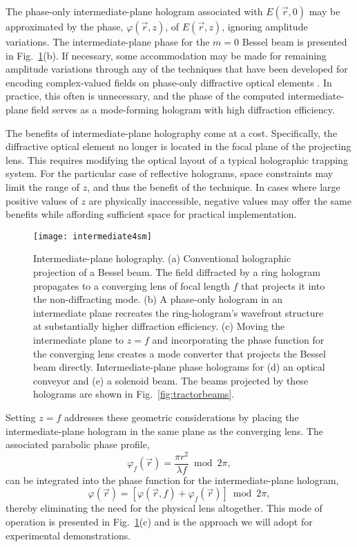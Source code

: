 The phase-only intermediate-plane hologram associated with
$E(\vec{r},0)$ may be approximated by the phase, $\varphi(\vec{r},z)$,
of $E(\vec{r},z)$, ignoring amplitude variations.
The intermediate-plane phase for the $m = 0$ Bessel beam
is presented in Fig.~\ref{fig:intermediate}(b).
If necessary, some accommodation may be made for remaining
amplitude variations through any of the techniques
that have been developed for encoding complex-valued
fields on phase-only diffractive optical elements \cite{roichman06}.
In practice, this often is unnecessary, and the phase of the
computed intermediate-plane field serves as a
mode-forming hologram with high diffraction efficiency.

The benefits of intermediate-plane holography come at
a cost.  Specifically, the diffractive optical element no
longer is located in the focal plane of the projecting
lens.  This requires modifying the optical layout of a typical
holographic trapping system.
For the particular case of reflective holograms,
space constraints may limit the range of $z$,
and thus the benefit of the technique.
In cases where large positive values of $z$ are 
physically inaccessible,
negative values may offer the same benefits while
affording sufficient space for practical implementation.

\begin{figure}[t!]
  \centering
  \texttt{[image: intermediate4sm]}
  \caption{Intermediate-plane holography. (a) Conventional
    holographic projection of a Bessel beam.  The field diffracted
    by a ring hologram propagates to a converging lens of
    focal length $f$ that
    projects it into the non-diffracting mode.
    (b) A phase-only hologram
    in an intermediate plane recreates the ring-hologram's
    wavefront structure at substantially higher diffraction efficiency.
    (c) Moving the intermediate plane to $z = f$ and incorporating
    the phase function for the converging lens
    creates a mode converter that projects the Bessel beam directly.
    Intermediate-plane phase holograms for
    (d) an optical conveyor and (e) a solenoid beam.  The beams
    projected by these holograms are shown in Fig.~\ref{fig:tractorbeams}.}
  \label{fig:intermediate}
\end{figure}

Setting $z = f$ addresses these geometric considerations
by placing the intermediate-plane hologram
in the same plane as the converging lens.
The associated parabolic phase profile,
\begin{equation}
  \label{eq:lensphase}
  \varphi_f(\vec{r}) = \frac{\pi r^2}{\lambda f}
  \bmod 2 \pi,
\end{equation}
can be integrated into the phase function
for the intermediate-plane hologram, 
\begin{equation}
  \label{eq:complete}
  \varphi(\vec{r}) 
  =
  \left[\varphi(\vec{r},f) +
  \varphi_f(\vec{r}) \right]
  \bmod 2 \pi, 
\end{equation}
thereby eliminating the need for
the physical lens altogether.
This mode of operation is presented in
Fig.~\ref{fig:intermediate}(c) and is the
approach we will adopt for experimental demonstrations.

